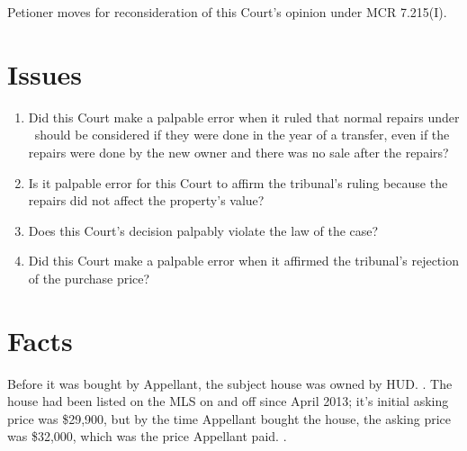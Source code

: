 \documentclass[12pt,\documentclassflag]{michiganCourtOfAppealsBrief}
\begin{document}



Petioner moves for reconsideration of this Court's opinion under MCR 7.215(I).

\section{Issues}

\begin{enumerate}
  
\item Did this Court make a palpable error when it ruled that normal repairs under \cite[s]{MCL 211.27(2)}\ should be considered if they were done in the year of a transfer, even if the repairs were done by the new owner and there was no sale after the repairs?
 
\item Is it palpable error for this Court to affirm the tribunal's ruling because the repairs did not affect the property's value?

\item Does this Court's decision palpably violate the law of the case?
  
\item Did this Court make a palpable error when it affirmed the tribunal's rejection of the purchase price?
\end{enumerate}

\section{Facts}
\label{facts}

Before it was bought by Appellant, the subject house was owned by HUD.
\mlsListing[]. 
The house had been listed on the MLS on and off since April 2013;
it's initial asking price was \$29,900,
but by the time Appellant bought the house, the asking price was \$32,000,
which was the price Appellant paid. \mlsHistory[].
\end{document}
